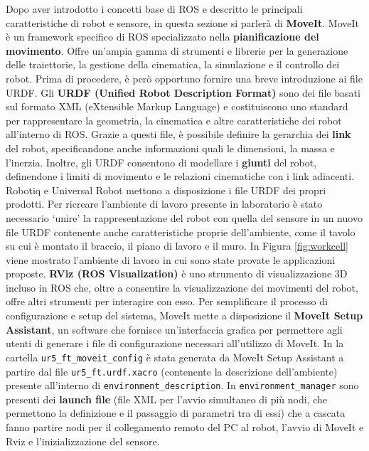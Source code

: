 Dopo aver introdotto i concetti base di ROS e descritto le principali caratteristiche di robot e sensore, in questa sezione si 
parler\`{a} di \textbf{MoveIt}. 
MoveIt \`{e} un framework specifico di ROS specializzato nella \textbf{pianificazione del movimento}. Offre un'ampia gamma 
di strumenti e librerie per la generazione delle traiettorie, la gestione della cinematica, la simulazione e il controllo 
dei robot. 
Prima di procedere, \`{e} per\`{o} opportuno fornire una breve introduzione ai file URDF.
Gli \textbf{URDF (Unified Robot Description Format)} sono dei file basati sul formato XML (eXtensible Markup Language) e 
costituiscono uno standard per rappresentare la geometria, la cinematica e altre caratteristiche dei robot all'interno di ROS. 
Grazie a questi file, è possibile definire la gerarchia dei \textbf{link} del robot, specificandone anche informazioni quali  
le dimensioni, la massa e l'inerzia. Inoltre, gli URDF consentono di modellare i \textbf{giunti}
del robot, definendone i limiti di movimento e le relazioni cinematiche con i link adiacenti. 
Robotiq e Universal Robot mettono a disposizione i file URDF dei propri prodotti. Per ricreare l'ambiente di lavoro presente in 
laboratorio \`{e} stato necessario `unire' la rappresentazione del robot con quella del sensore in un nuovo file URDF contenente 
anche caratteristiche proprie dell'ambiente, come il tavolo su cui \`{e} montato il braccio, il piano di lavoro e il muro. 
In Figura \ref{fig:workcell} viene mostrato l'ambiente di lavoro in cui sono state provate le applicazioni proposte. 
\textbf{RViz (ROS Visualization)} \`{e} uno strumento di visualizzazione 3D incluso in ROS che, oltre a consentire la visualizzazione 
dei movimenti del robot, offre altri strumenti per interagire con esso.  
Per semplificare il processo di configurazione e setup del sistema, MoveIt mette a disposizione il \textbf{MoveIt Setup Assistant},  
un software che fornisce un'interfaccia grafica per permettere agli utenti di generare i file di configurazione necessari 
all'utilizzo di MoveIt. 
In \cite{environment_setup} la cartella \verb|ur5_ft_moveit_config| \`{e} stata generata da MoveIt Setup Assistant a partire 
dal file \verb|ur5_ft.urdf.xacro| (contenente la descrizione dell'ambiente) presente all'interno di \verb|environment_description|. 
In \verb|environment_manager| sono presenti dei \textbf{launch file} (file XML per l'avvio simultaneo di pi\`{u} nodi, che 
permettono la definizione e il passaggio di parametri tra di essi) che a cascata fanno partire nodi per il collegamento remoto del 
PC al robot, l'avvio di MoveIt e Rviz e l'inizializzazione del sensore. 
